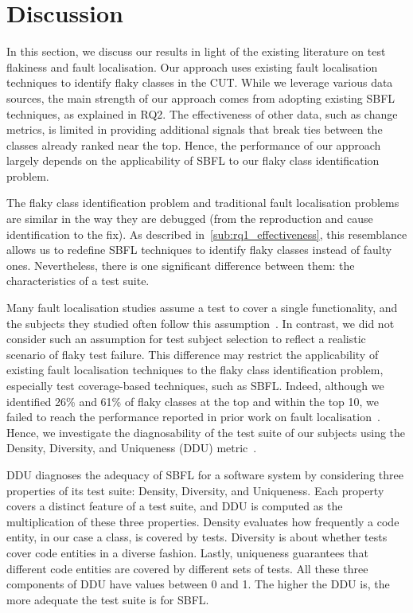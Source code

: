 \section{Discussion}
\label{sec:sherloc-discussion}

In this section, we discuss our results in light of the existing literature on test flakiness and fault localisation.
Our approach uses existing fault localisation techniques to identify flaky classes in the CUT.
While we leverage various data sources, the main strength of our approach comes from adopting existing SBFL techniques, as explained in RQ2. The effectiveness of other data, such as change metrics, is limited in providing additional signals that break ties between the classes already ranked near the top. Hence, the performance of our approach largely depends on the applicability of SBFL to our flaky class identification problem.  


The flaky class identification problem and traditional fault localisation problems are similar in the way they are debugged (\ie from the reproduction and cause identification to the fix). As described in~\ref{sub:rq1_effectiveness}, this resemblance allows us to redefine SBFL techniques to identify flaky classes instead of faulty ones. Nevertheless, there is one significant difference between them: the characteristics of a test suite. 

Many fault localisation studies assume a test to cover a single functionality, and the subjects they studied often follow this assumption~\cite{Lou:2021:fse,DeepFL,Wen:2019:tse}.
In contrast, we did not consider such an assumption for test subject selection to reflect a realistic scenario of flaky test failure. 
This difference may restrict the applicability of existing fault localisation techniques to the flaky class identification problem, especially test coverage-based techniques, such as SBFL.
Indeed, although we identified 26\% and 61\% of flaky classes at the top and within the top 10, we failed to reach the performance reported in prior work on fault localisation~\cite{wong2016survey}. Hence, we investigate
the diagnosability of the test suite of our subjects using the Density, Diversity, and Uniqueness (DDU) metric~\cite{perez:2017:icse}. 

DDU diagnoses the adequacy of SBFL for a software system by considering three properties of its test suite: Density, Diversity, and Uniqueness. Each property covers a distinct feature of a test suite, and DDU is computed as the multiplication of these three properties. 
Density evaluates how frequently a code entity, in our case a class, is covered by tests. Diversity is about whether tests cover code entities in a diverse fashion. Lastly, uniqueness guarantees that different code entities are covered by different sets of tests. 
All these three components of DDU have values between 0 and 1. The higher the DDU is, the more adequate the test suite is for SBFL. 

